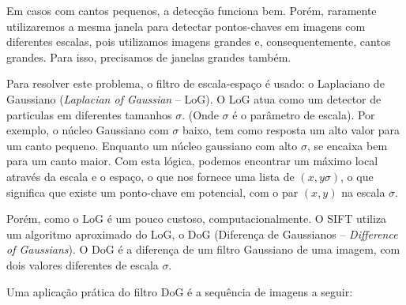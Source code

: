 Em casos com cantos pequenos, a detecção funciona bem. Porém, raramente utilizaremos a mesma janela para detectar pontos-chaves em imagens com diferentes escalas, pois utilizamos imagens grandes e, consequentemente, cantos grandes. Para isso, precisamos de janelas grandes também. 

Para resolver este problema, o filtro de escala-espaço é usado: o Laplaciano de Gaussiano (\emph{Laplacian of Gaussian} --  LoG). O LoG atua como um detector de particulas em diferentes tamanhos $\sigma$. (Onde $\sigma$ é o parâmetro de escala). Por exemplo, o núcleo Gaussiano com $\sigma$ baixo, tem como resposta um alto valor para um canto pequeno. Enquanto um núcleo gaussiano com alto $\sigma$, se encaixa bem para um canto maior. Com esta lógica, podemos encontrar um máximo local através da escala e o espaço, o que nos fornece uma lista de $(x,y \sigma)$, o que significa que existe um ponto-chave em potencial, com o par $(x,y)$ na escala $\sigma$.


Porém, como o LoG é um pouco custoso, computacionalmente. O SIFT utiliza um algoritmo aproximado do LoG, o DoG (Diferença de Gaussianos -- \emph{Difference of Gaussians}). O DoG é a diferença de um filtro Gaussiano de uma imagem, com dois valores diferentes de escala $\sigma$. 

\newpage

Uma aplicação prática do filtro DoG é a sequência de imagens a seguir:

